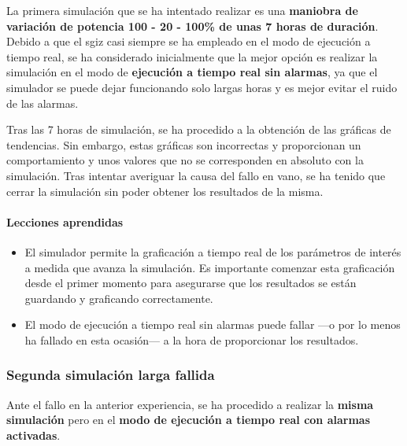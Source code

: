 La primera simulación que se ha intentado realizar es una \textbf{maniobra de variación de potencia 100 - 20 - 100\% de unas 7 horas de duración}. Debido a que el \acrshort{sgiz} casi siempre se ha empleado en el modo de ejecución a tiempo real, se ha considerado inicialmente que la mejor opción es realizar la simulación en el modo de \textbf{ejecución a tiempo real sin alarmas}, ya que el simulador se puede dejar funcionando solo largas horas y es mejor evitar el ruido de las alarmas.

Tras las 7 horas de simulación, se ha procedido a la obtención de las gráficas de tendencias. Sin embargo, estas gráficas son incorrectas y proporcionan un comportamiento y unos valores que no se corresponden en absoluto con la simulación. Tras intentar averiguar la causa del fallo en vano, se ha tenido que cerrar la simulación sin poder obtener los resultados de la misma.

\paragraph{Lecciones aprendidas}

\begin{itemize}
  \item El simulador permite la graficación a tiempo real de los parámetros de interés a medida que avanza la simulación. Es importante comenzar esta graficación desde el primer momento para asegurarse que los resultados se están guardando y graficando correctamente.
  \item El modo de ejecución a tiempo real sin alarmas puede fallar ---o por lo menos ha fallado en esta ocasión--- a la hora de proporcionar los resultados.
\end{itemize}

\subsubsection{Segunda simulación larga fallida} \label{sim_larga_fallida}

Ante el fallo en la anterior experiencia, se ha procedido a realizar la \textbf{misma simulación} pero en el \textbf{modo de ejecución a tiempo real con alarmas activadas}.

